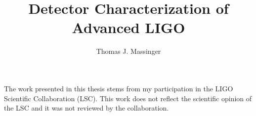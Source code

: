 \documentclass[12pt,notitlepage]{report}
\newcommand{\prd}{{\it Phys. Rev. D}}
\begin{document}
\title{Detector Characterization of Advanced LIGO}
\author{Thomas J. Massinger}
\havededicationtrue
\dedication{Well that was fun.}
\haveminorfalse
\copyrighttrue
\doctoratetrue
\figurespagetrue
\tablespagetrue
\electronicsubmitfalse


\Acknowledgments{
}

\beforepreface

The work presented in this thesis stems from my participation in the LIGO
Scientific Collaboration (LSC). This work does not reflect the
scientific opinion of the LSC and it was not reviewed by the collaboration.



%
%
%
%
%
%
%


\afterpreface

\label{ch:introduction}


\label{ch:o1results}


\label{ch:instrumentalDetchar}


\label{ch:IMCUpconversion}


\label{ch:ODC}


\label{ch:Vetoes}


\label{ch:GW150914-DQ}

\end{document}
